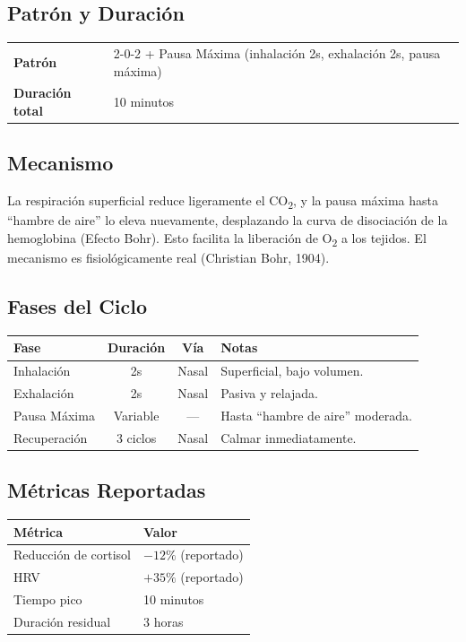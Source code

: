 \documentclass[12pt,a4paper]{article}
\begin{document}
\subsection*{Patrón y Duración}
\begin{tabularx}{\textwidth}{lX}
    \textbf{Patrón} & 2-0-2 + Pausa Máxima (inhalación 2s, exhalación 2s, pausa máxima) \\
    \textbf{Duración total} & 10 minutos \\
\end{tabularx}

\subsection*{Mecanismo}
La respiración superficial reduce ligeramente el CO\textsubscript{2}, y la pausa
máxima hasta ``hambre de aire'' lo eleva nuevamente, desplazando la curva de
disociación de la hemoglobina (Efecto Bohr). Esto facilita la liberación de
O\textsubscript{2} a los tejidos. El mecanismo es fisiológicamente real
(Christian Bohr, 1904).

\subsection*{Fases del Ciclo}
\begin{tabularx}{\textwidth}{lccX}
    \toprule
    \textbf{Fase} & \textbf{Duración} & \textbf{Vía} & \textbf{Notas} \\
    \midrule
    Inhalación & 2s & Nasal & Superficial, bajo volumen. \\
    Exhalación & 2s & Nasal & Pasiva y relajada. \\
    Pausa Máxima & Variable & — & Hasta ``hambre de aire'' moderada. \\
    Recuperación & 3 ciclos & Nasal & Calmar inmediatamente. \\
    \bottomrule
\end{tabularx}

\subsection*{Métricas Reportadas}
\begin{tabularx}{\textwidth}{lX}
    \toprule
    \textbf{Métrica} & \textbf{Valor} \\
    \midrule
    Reducción de cortisol & $-12\%$ (reportado) \\
    HRV & $+35\%$ (reportado) \\
    Tiempo pico & 10 minutos \\
    Duración residual & 3 horas \\
    \bottomrule
\end{tabularx}
\end{document}
